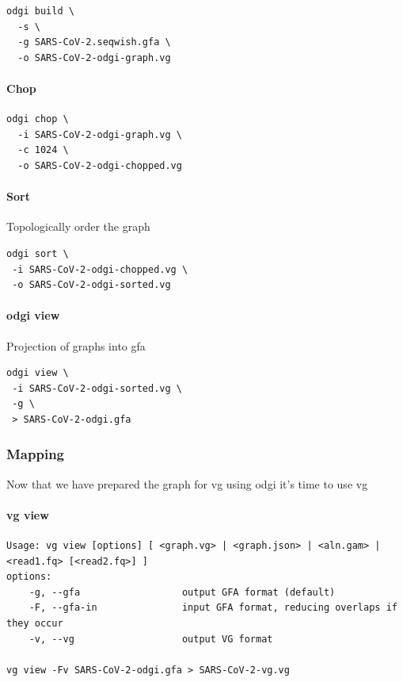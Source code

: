 \documentclass[10pt, a4paper]{article}
\begin{document}
\begin{verbatim}
odgi build \
  -s \
  -g SARS-CoV-2.seqwish.gfa \
  -o SARS-CoV-2-odgi-graph.vg
\end{verbatim}

\paragraph{Chop}
\label{sec:orge0632bf}

\begin{verbatim}
odgi chop \
  -i SARS-CoV-2-odgi-graph.vg \
  -c 1024 \
  -o SARS-CoV-2-odgi-chopped.vg
\end{verbatim}

\paragraph{Sort}
\label{sec:org68357bc}
Topologically order the graph

\begin{verbatim}
odgi sort \
 -i SARS-CoV-2-odgi-chopped.vg \
 -o SARS-CoV-2-odgi-sorted.vg
\end{verbatim}

\paragraph{odgi view}
\label{sec:orgbbdaa5a}
Projection of graphs into gfa

\begin{verbatim}
odgi view \
 -i SARS-CoV-2-odgi-sorted.vg \
 -g \
 > SARS-CoV-2-odgi.gfa
\end{verbatim}

\subsubsection{Mapping}
\label{sec:orge6f6152}
Now that we have prepared the graph for vg using odgi it’s time to use vg
\paragraph{vg view}
\label{sec:org9156b97}
\begin{verbatim}
Usage: vg view [options] [ <graph.vg> | <graph.json> | <aln.gam> | <read1.fq> [<read2.fq>] ]
options:
    -g, --gfa                  output GFA format (default)
    -F, --gfa-in               input GFA format, reducing overlaps if they occur
    -v, --vg                   output VG format

vg view -Fv SARS-CoV-2-odgi.gfa > SARS-CoV-2-vg.vg
\end{verbatim}
\end{document}
